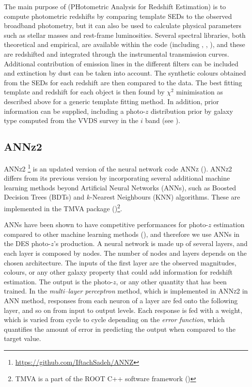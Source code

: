 The main purpose of \lephare (PHotometric Analysis for Redshift Estimation) is to compute photometric redshifts by comparing template SEDs to the observed broadband photometry, but it can also be used to calculate physical parameters such as stellar masses and rest-frame luminosities. Several spectral libraries, both theoretical and empirical, are available within the code (including \citealt{cww}, \citealt{poggianti}, \citealt{bc03}), and these are redshifted and integrated through the instrumental transmission curves.  Additional contribution of emission lines in the different filters can be included and extinction by dust can be taken into account.  The synthetic colours obtained from the SEDs for each redshift are then compared to the data. The best fitting template and redshift for each object is then found by $\chi^2$ minimisation as described above for a generic template fitting method. In addition, prior information can be supplied, including a photo-$z$ distribution prior by galaxy type computed from the VVDS survey in the $i$ band (see \citealt{ilbertlephare}). 



\subsection{ANNz2}\label{sec:annz2}

\textsc{ANNz2} \citep{annz2} \footnote{\url{https://github.com/IftachSadeh/ANNZ}} is an updated version of the neural network code \textsc{ANNz} (\citealt{annz}). 
\textsc{ANNz2} differs from its previous version by incorporating several additional machine learning methods beyond Artificial Neural Networks (ANNs), such as Boosted Decision Trees (BDTs) and $k$-Nearest Neighbours (KNN) algorithms. 
These are implemented in the TMVA package (\citealt{tmva})\footnote{TMVA is a part of the ROOT C++ software framework (\citealt{root})}.

ANNs have been shown to have competitive performances for photo-$z$ estimation compared to other machine learning methods (\citealt{firth}), and therefore we use ANNs in the DES photo-$z$'s production. A neural network is made up of several layers, and each layer is composed by nodes. The number of nodes and layers depends on the chosen architecture. The inputs of the first layer are the observed magnitudes, colours, or any other galaxy property that could add information for redshift estimation. The output is the photo-$z$, or any other quantity that has been trained. In the \emph{multi--layer perceptron} method, which is implemented in \textsc{ANNz2} in ANN method, responses from each neuron of a layer are fed onto the following layer, and so on from input to output levels. Each response is fed with a weight, which is varied from cycle to cycle depending on the \emph{error function}, which quantifies the amount of error in predicting the output when compared to the target value.

